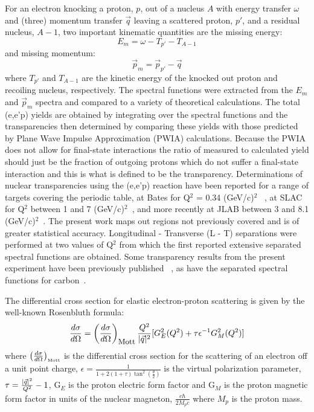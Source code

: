 \documentclass[aps,prl,twocolumn,showpacs,amsmath,amssymb,floats]{revtex4}
\begin{document}
For an electron knocking a proton, $p$, out of a nucleus $A$ with energy 
transfer $\omega$ and (three) momentum transfer $\vec{q}$ leaving a scattered 
proton, $p'$, and a residual nucleus, $A - 1$, two important kinematic 
quantities are the missing energy:
\begin{equation}
E_m = \omega - T_{p'} - T_{A-1}
\end{equation}
\noindent
and missing momentum:
\begin{equation}
\vec{p}_m = \vec{p}_{p'} - \vec{q}
\end{equation} 
\noindent
where $T_{p'}$ and $T_{A-1}$ are the kinetic energy of the knocked out proton 
and recoiling nucleus, respectively.  The 
spectral functions were extracted from the $E_m$ and $\vec{p}_m$ spectra and compared to a variety of theoretical calculations.  The total (e,e'p) yields are 
obtained by integrating over the spectral functions and the transparencies 
then determined by comparing these yields with those predicted by Plane Wave 
Impulse Approximation (PWIA) calculations.  Because the PWIA does not allow for final-state interactions the ratio of measured to calculated yield should just be the 
fraction of outgoing protons which do not suffer a final-state interaction and 
this is what is defined to be the transparency.  Determinations of nuclear 
transparencies using the (e,e'p) reaction have been reported for a range of 
targets covering the periodic table, at Bates for Q$^2$ = 0.34 (GeV/c)$^2$ 
~\cite{gerry92}, at SLAC for Q$^2$ between 1 and 7 (GeV/c)$^2$~\cite{ton95, mak94}, and 
more recently at JLAB between 3 and 8.1 (GeV/c)$^2$~\cite{garrow01}.  The 
present work maps out regions not previously covered and is of greater 
statistical accuracy.  Longitudinal - Transverse (L - T) separations were 
performed at two values of Q$^2$ from which the first reported extensive 
separated spectral functions are obtained.  Some transparency results from the 
present experiment have been previously published ~\cite{prl1}, as have the 
separated spectral functions for carbon~\cite{prc2}.

The differential cross section for elastic electron-proton scattering is given 
by the well-known Rosenbluth formula:
\begin{equation}
\label{cc1}
\frac{d\sigma}{d\Omega} = \left(\frac{d\sigma}{d\Omega}\right)_
{\mbox{\small Mott}}\frac{Q^2}{|\vec{q}|^2}[G_{E}^{2}(Q^2) + 
\tau\epsilon^{-1}G_{M}^{2}(Q^2)]
\end{equation}
\noindent                                                   
where $\left(\frac{d\sigma}{d\Omega}\right)_{\mbox{\tiny Mott}}$ is the differential 
cross 
section for the scattering of an electron off a unit point charge, $\epsilon =\frac{1}{1+2(1+\tau)\tan^2(\frac{\theta}{2})}$ is the 
virtual polarization parameter, ${\tau = {{|\vec{q}|^2}\over{Q^2}} - 1}$,  G$_E$ 
is the proton electric form factor and G$_M$ is 
the proton magnetic form factor in units of the nuclear magneton,  
$\frac{e\hbar}{2M_{p}c}$ where $M_p$ is the proton mass.
\end{document}
